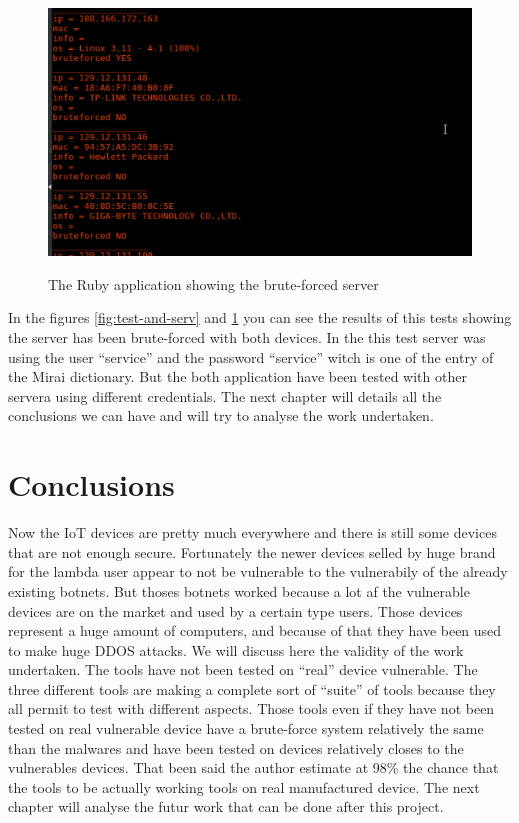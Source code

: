 \documentclass{report}
\begin{document}
\begin{figure}[h]
 \caption{The Ruby application showing the brute-forced server}
 \centering
 \includegraphics[width=1.2\textwidth]{./img/exp/screen-test-ruby}
 \label{fig:test-ruby-serv}
\end{figure}
In the figures \ref{fig:test-and-serv} and \ref{fig:test-ruby-serv} you can see the results of this tests showing the server has been brute-forced with both devices. In the this test server was using the user ``service'' and the password ``service'' witch is one of the entry of the Mirai dictionary. But the both application have been tested with other servera using different credentials.\newline
The next chapter will details all the conclusions we can have and will try to analyse the work undertaken.

\chapter{Conclusions}
Now the IoT devices are pretty much everywhere and there is still some devices that are not enough secure. Fortunately the newer devices selled by huge brand for the lambda user appear to not be vulnerable to the vulnerabily of the already existing botnets. But thoses botnets worked because a lot af the vulnerable devices are on the market and used by a certain type users. Those devices represent a huge amount of computers, and because of that they have been used to make huge DDOS attacks. We will discuss here the validity of the work undertaken.\newline
The tools have not been tested on ``real'' device vulnerable.\newline
The three different tools are making a complete sort of ``suite'' of tools because they all permit to test with different aspects.\newline
Those tools even if they have not been tested on real vulnerable device have a brute-force system relatively the same than the malwares and have been tested on devices relatively closes to the vulnerables devices. That been said the author estimate at 98\% the chance that the tools to be actually working tools on real manufactured device.\newline
The next chapter will analyse the futur work that can be done after this project.
\end{document}
